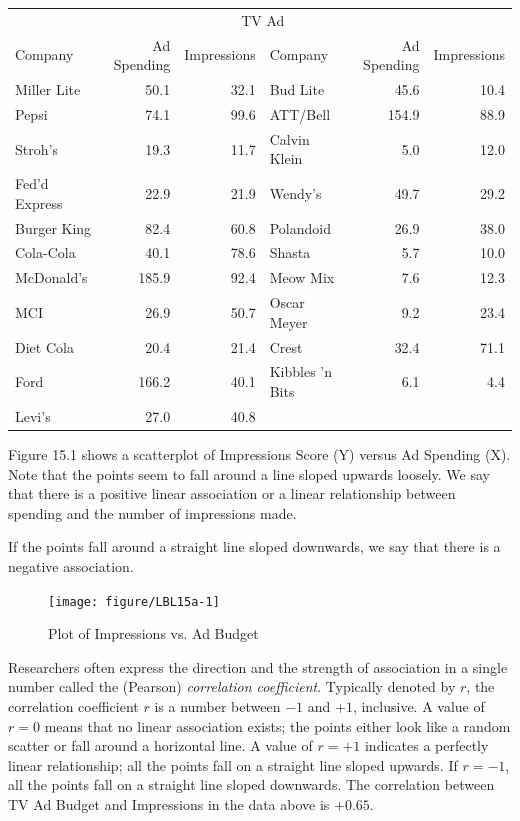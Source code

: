 \documentclass[11pt, chapterprefix=true]{scrbook}\usepackage[]{graphicx}\usepackage[]{color}
\begin{document}
\begin{table}[ht]
\centering 
\begin{tabular}{@{} lrr | lrr @{}} \hline
& \multicolumn{4}{c}{TV Ad} \\
Company & Ad Spending & Impressions & Company & Ad Spending & Impressions \\ \hline
Miller Lite & 50.1 & 32.1 & Bud Lite & 45.6 & 10.4\\
Pepsi & 74.1 & 99.6 & ATT/Bell & 154.9 & 88.9 \\
Stroh's & 19.3 & 11.7 & Calvin Klein & 5.0 & 12.0\\
Fed'd Express & 22.9 & 21.9 & Wendy's & 49.7 & 29.2\\
Burger King & 82.4 & 60.8 & Polandoid & 26.9 & 38.0\\
Cola-Cola & 40.1 & 78.6 & Shasta & 5.7 & 10.0\\
McDonald's & 185.9 & 92.4 & Meow Mix & 7.6 & 12.3\\
MCI & 26.9 & 50.7 & Oscar Meyer & 9.2 & 23.4\\
Diet Cola & 20.4 & 21.4 & Crest & 32.4 & 71.1\\
Ford & 166.2 & 40.1 & Kibbles 'n Bits & 6.1 & 4.4\\
Levi's & 27.0 & 40.8 \\ \hline
\end{tabular}
\end{table}

Figure 15.1 shows a scatterplot of Impressions Score (Y) versus Ad Spending (X). Note that the points seem to fall around a line sloped upwards loosely.  We say that there is a positive linear association or a linear relationship between spending and the number of impressions made.  

If the points fall around a straight line sloped downwards, we say that there is a negative association.

\begin{figure}[ht]
\caption{Plot of Impressions vs. Ad Budget}
\centering



{\centering \texttt{[image: figure/LBL15a-1]} 

}



\end{figure}

Researchers often express the direction and the strength of association in a single number called the (Pearson) \textit{correlation coefficient}.  Typically denoted by $r$, the correlation coefficient $r$ is a number between $-1$ and $+1$, inclusive.  A value of $r = 0$ means that no linear association exists; the points either look like a random scatter or fall around a horizontal line.  A value of $r = +1$ indicates a perfectly linear relationship; all the points fall on a straight line sloped upwards.  If $r = -1$, all the points fall on a straight line sloped downwards. The correlation between TV Ad Budget and Impressions in the data above is $+0.65$.
\end{document}
